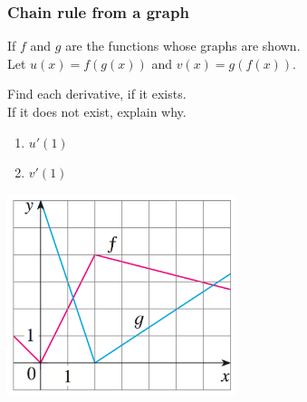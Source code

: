 \begin{frame}
	\frametitle{Chain rule from a graph}

	If $f$ and $g$ are the functions whose graphs are shown. \\ Let $u(x)=f(g(x))$
	and $v(x)=g(f(x))$. \\
	\medskip

	Find each derivative, if it exists. \\ If it does not exist, explain why.

	\begin{enumerate}
		\item $u'(1)$

		\item $v'(1)$
	\end{enumerate}
	\vspace{-1cm}

	\begin{center}
		\includegraphics[width=0.5\textwidth]{G10}
	\end{center}
\end{frame}

